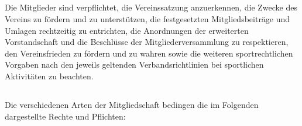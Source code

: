 \documentclass[10pt,a4paper]{article}
\begin{document}
\subsection{}
Die Mitglieder sind verpflichtet, die Vereinssatzung anzuerkennen, die Zwecke des Vereins zu fördern und
zu unterstützen, die festgesetzten Mitgliedsbeiträge und Umlagen rechtzeitig zu entrichten, die Anordnungen der
erweiterten Vorstandschaft und die Beschlüsse der Mitgliederversammlung zu respektieren, den Vereinsfrieden
zu fördern und zu wahren sowie die weiteren sportrechtlichen Vorgaben nach den jeweils geltenden
Verbandsrichtlinien bei sportlichen Aktivitäten zu beachten.
\subsection{}
Die verschiedenen Arten der Mitgliedschaft bedingen die im Folgenden dargestellte Rechte und Pflichten:
\end{document}
